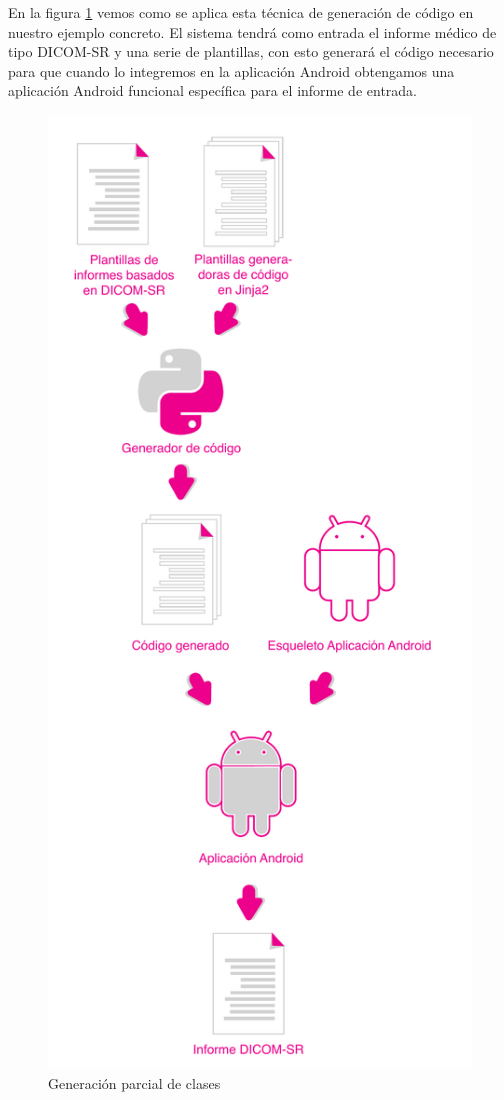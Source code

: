 En la figura \ref{fig:generacion} vemos como se aplica esta técnica de generación de código en nuestro ejemplo concreto. El sistema tendrá como entrada el informe médico de tipo DICOM-SR y una serie de plantillas, con esto generará el código necesario para que cuando lo integremos en la aplicación Android obtengamos una aplicación Android funcional específica para el informe de entrada. \par
\begin{figure}[ht]
\centering
\includegraphics[scale=0.6]{./imgs/esquemas/generacion.pdf}
\caption{Generación parcial de clases}
\label{fig:generacion}
\end{figure}

